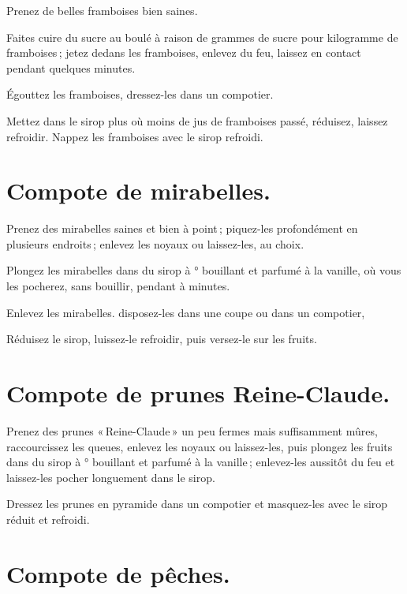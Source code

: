 Prenez de belles framboises bien saines.

Faites cuire du sucre au boulé à raison de {\mmm} grammes de sucre pour
{\mmm} kilogramme de framboises ; jetez dedans les framboises, enlevez du
feu, laissez en contact pendant quelques minutes.

Égouttez les framboises, dressez-les dans un compotier.

Mettez dans le sirop plus où moins de jus de framboises passé, réduisez, laissez
refroidir. Nappez les framboises avec le sirop refroidi.

\section*{\centering Compote de mirabelles.}
{}

Prenez des mirabelles saines et bien à point ; piquez-les profondément en
plusieurs endroits ; enlevez les noyaux ou laissez-les, au choix.

Plongez les mirabelles dans du sirop à {\mmm}° bouillant et parfumé
à la vanille, où vous les pocherez, sans bouillir, pendant {\mmm}
à {\mmm} minutes.

Enlevez les mirabelles. disposez-les dans une coupe ou dans un compotier,

Réduisez le sirop, luissez-le refroidir, puis versez-le sur les fruits.

\section*{\centering Compote de prunes Reine-Claude.}
{}

Prenez des prunes « Reine-Claude » un peu fermes mais suffisamment mûres,
raccourcissez les queues, enlevez les noyaux ou laissez-les, puis plongez les
fruits dans du sirop à {\mmm}° bouillant et parfumé à la vanille ;
enlevez-les aussitôt du feu et laissez-les pocher longuement dans le sirop.

Dressez les prunes en pyramide dans un compotier et masquez-les avec le sirop
réduit et refroidi.

\section*{\centering Compote de pêches.}
{}

